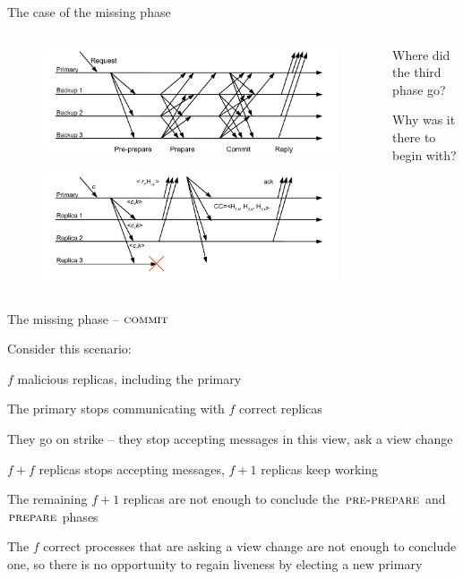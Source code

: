\begin{frame}{The case of the missing phase}

\begin{columns}
\begin{column}{0.6\textwidth}
\begin{figure}
	\includegraphics[width=\textwidth]{messages4}
\end{figure}
\begin{figure}
	\includegraphics[width=\textwidth]{messages10}	
\end{figure}
\end{column}
\begin{column}{0.4\textwidth}
\BIL
\item Where did the third phase go?
\item Why was it there to begin with?
\EIL	
\end{column}
\end{columns}
\end{frame}

\begin{frame}{The missing phase -- $\textsc{commit}$}
	
Consider this scenario:
\BI
\item $f$ malicious replicas, including the primary
\item The primary stops communicating with $f$ correct replicas
\item They go on strike -- they stop accepting messages in this view, ask
a view change
\item $f+f$ replicas stops accepting messages, $f+1$ replicas keep working
\item The remaining $f+1$ replicas are not enough to conclude the $\textsc{pre-prepare}$ and
  $\textsc{prepare}$ phases
\item The $f$ correct processes that are asking a view change are not enough
  to conclude one, so there is no opportunity to regain liveness by electing
  a new primary
\EI
		
\end{frame}	

